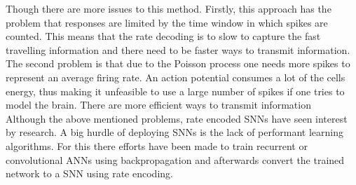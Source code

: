 Though there are more issues to this method. Firstly, this approach has the problem that responses are limited by the time window in which spikes are counted\cite{andrew_spiking_2003}. This means that the rate decoding is to slow to capture the fast travelling information\cite{guo_neural_2021} and there need to be faster ways to transmit information.
The second problem is that due to the Poisson process one needs more spikes to represent an average firing rate. An action potential consumes a lot of the cells energy\cite{attwell_energy_2001}, thus making it unfeasible to use a large number of spikes if one tries to model the brain. There are more efficient ways to transmit information\\

Although the above mentioned problems, rate encoded \acp{SNN} have seen interest by research. A big hurdle of deploying \acp{SNN} is the lack of performant learning algorithms. For this there efforts have been made to train recurrent or convolutional \acp{ANN} using backpropagation and afterwards convert the trained network to a \ac{SNN}\cite{pfeiffer_deep_2018} using rate encoding\cite{diehl_conversion_2016}\cite{diehl_fast-classifying_2015}.

